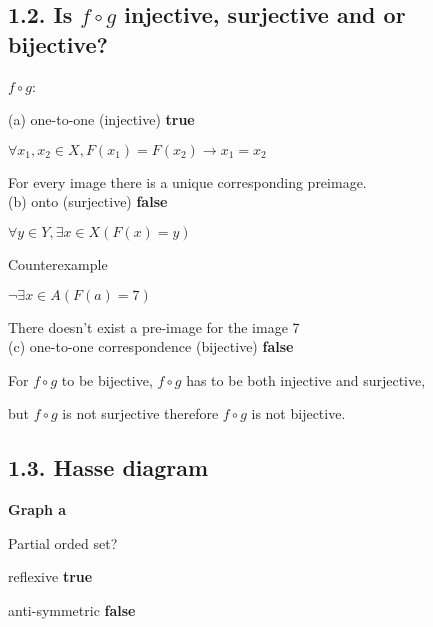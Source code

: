 \documentclass[a4paper,11pt]{article}
\begin{document}
\newpage
\subsection*{1.2. Is $f \circ g$ injective, surjective and or bijective?}

$f \circ g$:
\begin{center}
\end{center}

\noindent (a) one-to-one (injective) \textbf{true}

$\forall x_1, x_2 \in X, F(x_1) = F(x_2) \to x_1 = x_2$

For every image there is a unique corresponding preimage.\\

\noindent (b) onto (surjective) \textbf{false}

$\forall y \in Y, \exists x \in X (F(x) = y)$

Counterexample

$\neg \exists x \in A (F(a)=7)$

There doesn't exist a pre-image for the image 7\\

\noindent (c) one-to-one correspondence (bijective) \textbf{false}

For $f \circ g$ to be bijective, $f \circ g$ has to be both injective and surjective,

but $f \circ g$ is not surjective therefore $f \circ g$ is not bijective.

\newpage
\subsection*{1.3. Hasse diagram}


\textbf{Graph a}

\noindent Partial orded set?

reflexive \textbf{true}

anti-symmetric \textbf{false}
\end{document}
